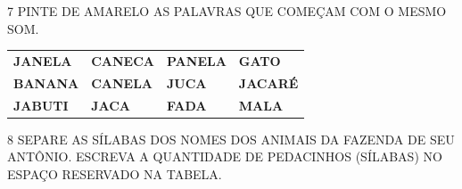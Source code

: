\num{7} PINTE DE AMARELO AS PALAVRAS QUE COMEÇAM COM O MESMO SOM.


\begin{longtable}[]{@{}llll@{}}
\toprule
\textbf{JANELA} & \textbf{CANECA} & \textbf{PANELA} &
\textbf{GATO}\tabularnewline
\textbf{BANANA} & \textbf{CANELA} & \textbf{JUCA} &
\textbf{JACARÉ}\tabularnewline
\textbf{JABUTI} & \textbf{JACA} & \textbf{FADA} &
\textbf{MALA}\tabularnewline
\bottomrule
\end{longtable}


\pagebreak
\num{8} SEPARE AS SÍLABAS DOS NOMES DOS ANIMAIS
DA FAZENDA DE SEU ANTÔNIO. ESCREVA A QUANTIDADE DE PEDACINHOS (SÍLABAS) NO ESPAÇO RESERVADO NA TABELA.
\bigskip


